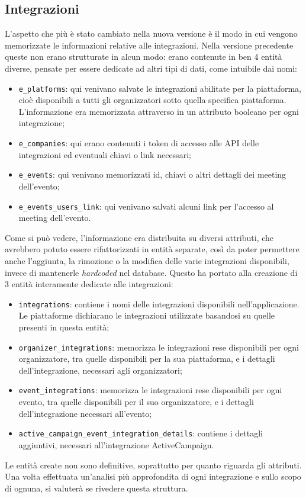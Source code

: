 \subsection{Integrazioni} \label{modelli:integrazioni}
L'aspetto che più è stato cambiato nella nuova versione è il modo in cui vengono memorizzate le informazioni relative alle integrazioni. Nella versione precedente queste non erano strutturate in alcun modo: erano contenute in ben 4 entità diverse, pensate per essere dedicate ad altri tipi di dati, come intuibile dai nomi:
\begin{itemize}
	\item \verb|e_platforms|: qui venivano salvate le integrazioni abilitate per la piattaforma, cioè disponibili a tutti gli organizzatori sotto quella specifica piattaforma. L'informazione era memorizzata attraverso in un attributo booleano per ogni integrazione;
	\item \verb|e_companies|: qui erano contenuti i token di accesso alle API delle integrazioni ed eventuali chiavi o link necessari;
	\item \verb|e_events|: qui venivano memorizzati id, chiavi o altri dettagli dei meeting dell'evento;
	\item \verb|e_events_users_link|: qui venivano salvati alcuni link per l'accesso al meeting dell'evento.
\end{itemize}
Come si può vedere, l'informazione era distribuita su diversi attributi, che avrebbero potuto essere rifattorizzati in entità separate, così da poter permettere anche l'aggiunta, la rimozione o la modifica delle varie integrazioni disponibili, invece di mantenerle \emph{hardcoded} nel database. Questo ha portato alla creazione di 3 entità interamente dedicate alle integrazioni:
\begin{itemize}
	\item \verb|integrations|: contiene i nomi delle integrazioni disponibili nell'applicazione. Le piattaforme dichiarano le integrazioni utilizzate basandosi su quelle presenti in questa entità;
	\item \verb|organizer_integrations|: memorizza le integrazioni rese disponibili per ogni organizzatore, tra quelle disponibili per la sua piattaforma, e i dettagli dell'integrazione, necessari agli organizzatori;
	\item \verb|event_integrations|: memorizza le integrazioni rese disponibili per ogni evento, tra quelle disponibili per il suo organizzatore, e i dettagli dell'integrazione necessari all'evento;
	\item \verb|active_campaign_event_integration_details|: contiene i dettagli aggiuntivi, necessari all'integrazione ActiveCampaign.
\end{itemize}
Le entità create non sono definitive, soprattutto per quanto riguarda gli attributi. Una volta effettuata un'analisi più approfondita di ogni integrazione e sullo scopo di ognuna, si valuterà se rivedere questa struttura.


